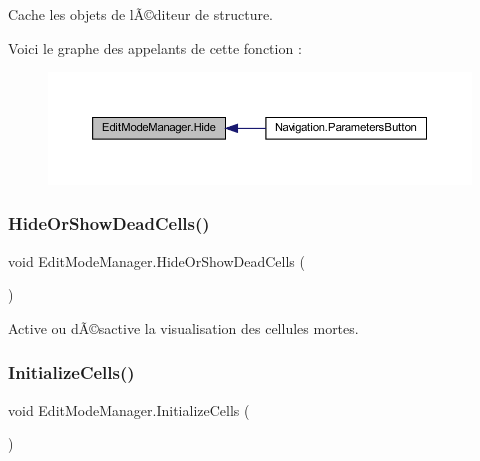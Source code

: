 Cache les objets de l\textquotesingle{}Ã©diteur de structure. 

Voici le graphe des appelants de cette fonction \+:
\nopagebreak
\begin{figure}[H]
\begin{center}
\leavevmode
\includegraphics[width=350pt]{class_edit_mode_manager_aacc30d9cdb3d747fbad20130903ec24e_icgraph}
\end{center}
\end{figure}
\mbox{\label{class_edit_mode_manager_ad64498838abd29826c929cad104924be}} 
\subsubsection{\texorpdfstring{Hide\+Or\+Show\+Dead\+Cells()}{HideOrShowDeadCells()}}
{\footnotesize\ttfamily void Edit\+Mode\+Manager.\+Hide\+Or\+Show\+Dead\+Cells (\begin{DoxyParamCaption}{ }\end{DoxyParamCaption})\hspace{0.3cm}{\ttfamily [inline]}}



Active ou dÃ©sactive la visualisation des cellules mortes. 

\mbox{\label{class_edit_mode_manager_a8a950f58c809a7161d85e5d9a73e4d15}} 
\subsubsection{\texorpdfstring{Initialize\+Cells()}{InitializeCells()}}
{\footnotesize\ttfamily void Edit\+Mode\+Manager.\+Initialize\+Cells (\begin{DoxyParamCaption}{ }\end{DoxyParamCaption})\hspace{0.3cm}{\ttfamily [inline]}}



